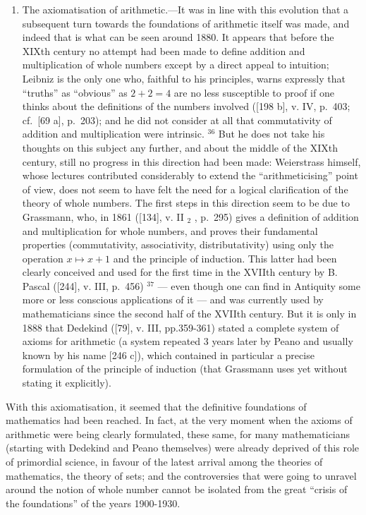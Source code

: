 \begin{enumerate}
\def\labelenumi{\Alph{enumi})}
\setcounter{enumi}{3}
\tightlist
\item
  The axiomatisation of arithmetic.---It was in line with this evolution that a subsequent turn towards the foundations of arithmetic itself was made, and indeed that is what can be seen around 1880. It appears that before the XIXth century no attempt had been made to define addition and multiplication of whole numbers except by a direct appeal to intuition; Leibniz is the only one who, faithful to his principles, warns expressly that ``truths'' as ``obvious'' as \(2 + 2 = 4\) are no less susceptible to proof if one thinks about the definitions of the numbers involved ({[}198 b{]}, v. IV, p.~403; cf.~{[}69 a{]}, p.~203); and he did not consider at all that commutativity of addition and multiplication were intrinsic. \(^{36}\) But he does not take his thoughts on this subject any further, and about the middle of the XIXth century, still no progress in this direction had been made: Weierstrass himself, whose lectures contributed considerably to extend the ``arithmeticising'' point of view, does not seem to have felt the need for a logical clarification of the theory of whole numbers. The first steps in this direction seem to be due to Grassmann, who, in 1861 ({[}134{]}, v. II \(_{2}\) , p.~295) gives a definition of addition and multiplication for whole numbers, and proves their fundamental properties (commutativity, associativity, distributativity) using only the operation \(x \mapsto x + 1\) and the principle of induction. This latter had been clearly conceived and used for the first time in the XVIIth century by B. Pascal ({[}244{]}, v. III, p.~456) \(^{37}\) --- even though one can find in Antiquity some more or less conscious applications of it --- and was currently used by mathematicians since the second half of the XVIIth century. But it is only in 1888 that Dedekind ({[}79{]}, v. III, pp.359-361) stated a complete system of axioms for arithmetic (a system repeated 3 years later by Peano and usually known by his name {[}246 c{]}), which contained in particular a precise formulation of the principle of induction (that Grassmann uses yet without stating it explicitly).
\end{enumerate}

With this axiomatisation, it seemed that the definitive foundations of mathematics had been reached. In fact, at the very moment when the axioms of arithmetic were being clearly formulated, these same, for many mathematicians (starting with Dedekind and Peano themselves) were already deprived of this role of primordial science, in favour of the latest arrival among the theories of mathematics, the theory of sets; and the controversies that were going to unravel around the notion of whole number cannot be isolated from the great ``crisis of the foundations'' of the years 1900-1930.
